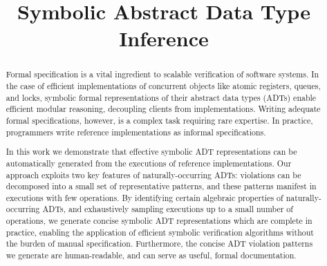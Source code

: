 \documentclass[9pt,preprint,nocopyrightspace,natbib,authoryear]{sigplanconf}
\begin{document}
\setlength{\pdfpageheight}{\paperheight}
\setlength{\pdfpagewidth}{\paperwidth}






\title{Symbolic Abstract Data Type Inference}

\authorinfo{}{}{}


\maketitle

\begin{abstract}

  Formal specification is a vital ingredient to scalable verification of
  software systems. In the case of efficient implementations of concurrent
  objects like atomic registers, queues, and locks, symbolic formal
  representations of their abstract data types (ADTs) enable efficient modular
  reasoning, decoupling clients from implementations. Writing adequate formal
  specifications, however, is a complex task requiring rare expertise. In
  practice, programmers write reference implementations as informal
  specifications.

  In this work we demonstrate that effective symbolic ADT representations can
  be automatically generated from the executions of reference implementations.
  Our approach exploits two key features of naturally-occurring ADTs: violations
  can be decomposed into a small set of representative patterns, and these
  patterns manifest in executions with few operations. By identifying certain
  algebraic properties of naturally-occurring ADTs, and exhaustively sampling
  executions up to a small number of operations, we generate concise symbolic
  ADT representations which are complete in practice, enabling the application
  of efficient symbolic verification algorithms without the burden of manual
  specification. Furthermore, the concise ADT violation patterns we generate
  are human-readable, and can serve as useful, formal documentation.

\end{abstract}
\end{document}

